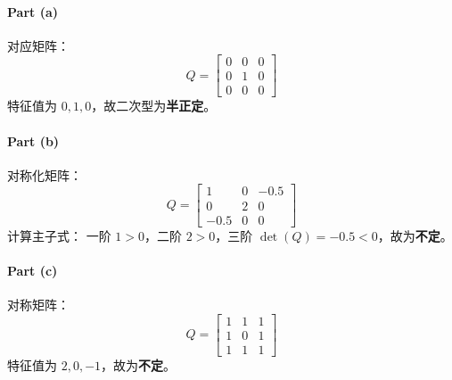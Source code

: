 \paragraph{Part (a)}  
对应矩阵：
\[
Q = \begin{bmatrix}
0 & 0 & 0 \\
0 & 1 & 0 \\
0 & 0 & 0
\end{bmatrix}
\]
特征值为 \(0, 1, 0\)，故二次型为\textbf{半正定}。

\paragraph{Part (b)}  
对称化矩阵：
\[
Q = \begin{bmatrix}
1 & 0 & -0.5 \\
0 & 2 & 0 \\
-0.5 & 0 & 0
\end{bmatrix}
\]
计算主子式：  
一阶 \(1 > 0\)，二阶 \(2 > 0\)，三阶 \(\det(Q) = -0.5 < 0\)，故为\textbf{不定}。

\paragraph{Part (c)}  
对称矩阵：
\[
Q = \begin{bmatrix}
1 & 1 & 1 \\
1 & 0 & 1 \\
1 & 1 & 1
\end{bmatrix}
\]
特征值为 \(2, 0, -1\)，故为\textbf{不定}。